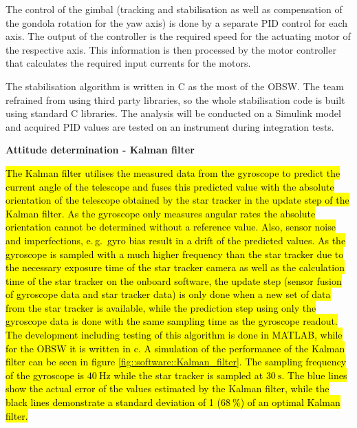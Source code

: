 The control of the gimbal (tracking and stabilisation as well as compensation of the gondola rotation for the yaw axis) is done by a separate PID control for each axis. The output of the controller is the required speed for the actuating motor of the respective axis. This information is then processed by the motor controller that calculates the required input currents for the motors.

The stabilisation algorithm is written in C as the most of the OBSW. The team refrained from using third party libraries, so the whole stabilisation code is built using standard C libraries. The analysis will be conducted on a Simulink model and acquired PID values are tested on an instrument during integration tests.

\textbf{Attitude determination - Kalman filter}

\hl{The Kalman filter utilises the measured data from the gyroscope to predict the current angle of the telescope and fuses this predicted value with the absolute orientation of the telescope obtained by the star tracker in the update step of the Kalman filter. As the gyroscope only measures angular rates the absolute orientation cannot be determined without a reference value. Also, sensor noise and imperfections, e.\,g.~gyro bias result in a drift of the predicted values. As the gyroscope is sampled with a much higher frequency than the star tracker due to the necessary exposure time of the star tracker camera as well as the calculation time of the star tracker on the onboard software, the update step (sensor fusion of gyroscope data and star tracker data) is only done when a new set of data from the star tracker is available, while the prediction step using only the gyroscope data is done with the same sampling time as the gyroscope readout. The development including testing of this algorithm is done in MATLAB, while for the OBSW it is written in c. A simulation of the performance of the Kalman filter can be seen in figure \mbox{\ref{fig::software::Kalman_filter}}. 
The sampling frequency of the gyroscope is $\SI{40}{\Hz}$ while the star tracker is sampled at $\SI{30}{\second}$. The blue lines show the actual error of the values estimated by the Kalman filter, while the black lines demonstrate a standard deviation of 1 ($\SI{68}{\percent}$) of an optimal Kalman filter. }

